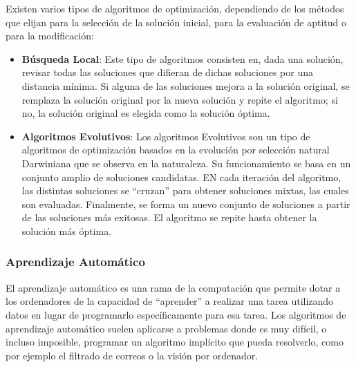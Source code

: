 Existen varios tipos de algoritmos de optimización, dependiendo de los métodos que elijan para la selección de la solución inicial, para la evaluación de aptitud o para la modificación:
\begin{itemize}
\item \textbf{Búsqueda Local}: Este tipo de algoritmos consisten en, dada una solución, revisar todas las soluciones que difieran de dichas soluciones por una distancia mínima. Si alguna de las soluciones mejora a la solución original, se remplaza la solución original por la nueva solución y repite el algoritmo; si no, la solución original es elegida como la solución óptima.
\item \textbf{Algoritmos Evolutivos}: Los algoritmos Evolutivos son un tipo de algoritmos de optimización basados en la evolución por selección natural Darwiniana que se observa en la naturaleza. Su funcionamiento se basa en un conjunto amplio de soluciones candidatas. EN cada iteración del algoritmo, las distintas soluciones se ``cruzan'' para obtener soluciones mixtas, las cuales son evaluadas. Finalmente, se forma un nuevo conjunto de soluciones a partir de las soluciones más exitosas. El algoritmo se repite hasta obtener la solución más óptima.
\end{itemize} 

\subsubsection{Aprendizaje Automático}
El aprendizaje automático es una rama de la computación que permite dotar a los ordenadores de la capacidad de ``aprender'' a realizar una tarea utilizando datos en lugar de programarlo específicamente para esa tarea\cite{machine_learning}. Los algoritmos de aprendizaje automático suelen aplicarse a problemas donde es muy difícil, o incluso imposible, programar un algoritmo implícito que pueda resolverlo, como por ejemplo el filtrado de correos o la visión por ordenador.

